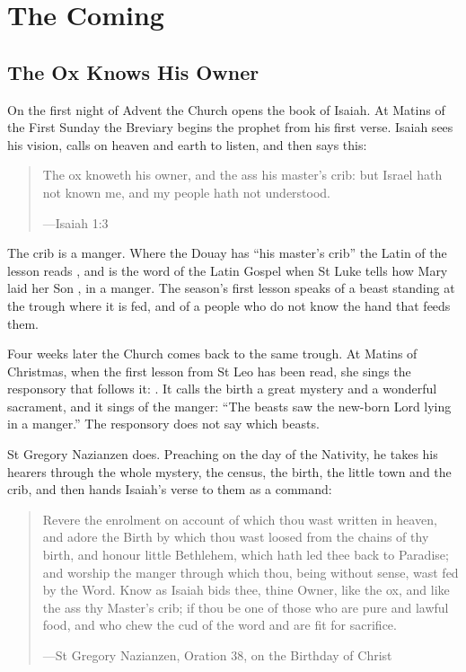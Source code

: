 \section{The Coming}

\subsection{The Ox Knows His Owner}\label{sec:ox}

On the first night of Advent the Church opens the book of Isaiah. At Matins of
the First Sunday the Breviary begins the prophet from his first verse. Isaiah
sees his vision, calls on heaven and earth to listen, and then says this:

\begin{quote}
The ox knoweth his owner, and the ass his master's crib: but Israel hath not
known me, and my people hath not understood.\par
{\smallskip\noindent\small ---Isaiah 1:3\par}
\end{quote}

The crib is a manger. Where the Douay has ``his master's crib'' the Latin of the
lesson reads , and  is the word of the
Latin Gospel when St Luke tells how Mary laid her Son , in a
manger. The season's first lesson speaks of a beast standing at the trough
where it is fed, and of a people who do not know the hand that feeds them.

Four weeks later the Church comes back to the same trough. At Matins of
Christmas, when the first lesson from St Leo has been read, she sings the
responsory that follows it: . It
calls the birth a great mystery and a wonderful sacrament, and it sings of the
manger: ``The beasts saw the new-born Lord lying in a manger.'' The responsory
does not say which beasts.

St Gregory Nazianzen does. Preaching on the day of the Nativity, he
takes his hearers through the whole mystery, the census, the birth, the little
town and the crib, and then hands Isaiah's verse to them as a command:

\begin{quote}
Revere the enrolment on account of which thou wast written in heaven, and adore
the Birth by which thou wast loosed from the chains of thy birth, and honour
little Bethlehem, which hath led thee back to Paradise; and worship the manger
through which thou, being without sense, wast fed by the Word. Know as Isaiah
bids thee, thine Owner, like the ox, and like the ass thy Master's crib; if thou
be one of those who are pure and lawful food, and who chew the cud of the word
and are fit for sacrifice.\par
{\smallskip\noindent\small ---St Gregory Nazianzen, Oration 38, on the Birthday of Christ\par}
\end{quote}

